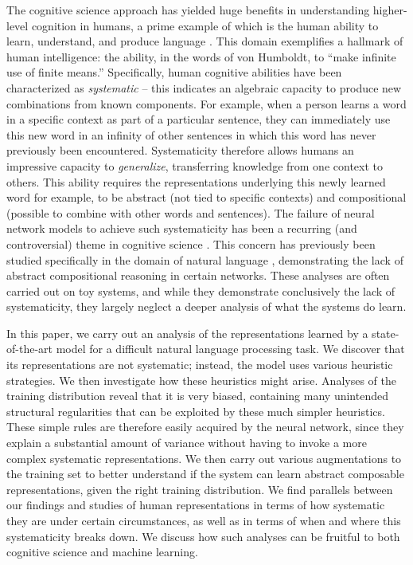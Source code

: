 The cognitive science approach has yielded huge benefits in understanding higher-level cognition in humans, a prime example of which is the human ability to learn, understand, and produce language \citep{chomsky2002syntactic, linzen2019can}. This domain exemplifies a hallmark of human intelligence: the ability, in the words of von Humboldt, to ``make infinite use of finite means.'' Specifically, human cognitive abilities have been characterized as \textit{systematic} \citep{fodor88, lake2019human} -- this indicates an algebraic capacity to produce new combinations from known components. For example, when a person learns a word in a specific context as part of a particular sentence, they can immediately use this new word in an infinity of other sentences in which this word has never previously been encountered. Systematicity therefore allows humans an impressive capacity to \textit{generalize}, transferring knowledge from one context to others. This ability requires the representations underlying this newly learned word for example, to be abstract (not tied to specific contexts) and compositional (possible to combine with other words and sentences). The failure of neural network models to achieve such systematicity has been a recurring (and controversial) theme in cognitive science \citep{fodor88,lake18}. This concern has previously been studied specifically in the domain of natural language \citep{lake17, gershman15, belinkov2019analysis}, demonstrating the lack of abstract compositional reasoning in certain networks. These analyses are often carried out on toy systems, and while they demonstrate conclusively the lack of systematicity, they largely neglect a deeper analysis of what the systems do learn. 


In this paper, we carry out an analysis of the representations learned by a state-of-the-art model for a difficult natural language processing task. We discover that its representations are not systematic; instead, the model uses various heuristic strategies. We then investigate how these heuristics might arise. Analyses of the training distribution reveal that it is very biased, containing many unintended structural regularities that can be exploited by these much simpler heuristics. These simple rules are therefore easily acquired by the neural network, since they explain a substantial amount of variance without having to invoke a more complex systematic representations. We then carry out various augmentations to the training set to better understand if the system can learn abstract composable representations, given the right training distribution. We find parallels between our findings and studies of human representations in terms of how systematic they are under certain circumstances, as well as in terms of when and where this systematicity breaks down. We discuss how such analyses can be fruitful to both cognitive science and machine learning.

